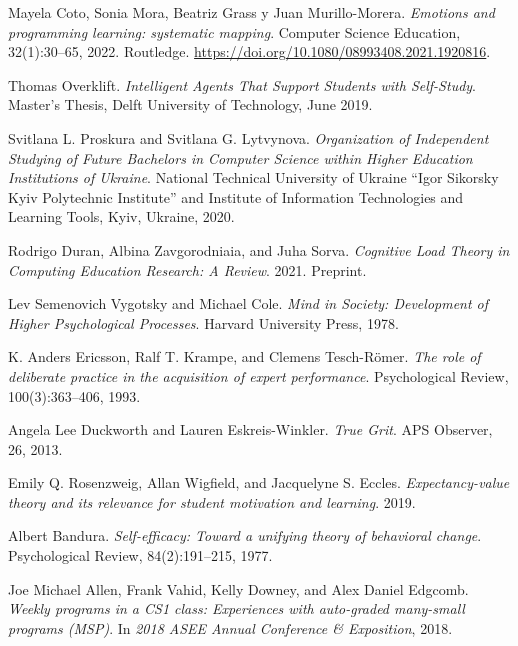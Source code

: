 \documentclass{article}
\begin{document}
\begin{thebibliography}{99}

Mayela Coto, Sonia Mora, Beatriz Grass y Juan Murillo-Morera. 
\textit{Emotions and programming learning: systematic mapping}. 
Computer Science Education, 32(1):30--65, 2022. 
Routledge. 
\url{https://doi.org/10.1080/08993408.2021.1920816}.

Thomas Overklift. 
\textit{Intelligent Agents That Support Students with Self-Study}. 
Master's Thesis, Delft University of Technology, June 2019.

Svitlana L. Proskura and Svitlana G. Lytvynova. 
\textit{Organization of Independent Studying of Future Bachelors in Computer Science within Higher Education Institutions of Ukraine}. 
National Technical University of Ukraine “Igor Sikorsky Kyiv Polytechnic Institute” and Institute of Information Technologies and Learning Tools, Kyiv, Ukraine, 2020.

Rodrigo Duran, Albina Zavgorodniaia, and Juha Sorva.
\textit{Cognitive Load Theory in Computing Education Research: A Review}.
2021. Preprint.

Lev Semenovich Vygotsky and Michael Cole.
\textit{Mind in Society: Development of Higher Psychological Processes}.
Harvard University Press, 1978.

K. Anders Ericsson, Ralf T. Krampe, and Clemens Tesch-R{\"o}mer.
\textit{The role of deliberate practice in the acquisition of expert performance}.
Psychological Review, 100(3):363--406, 1993.

Angela Lee Duckworth and Lauren Eskreis-Winkler.
\textit{True Grit}.
APS Observer, 26, 2013.

Emily Q. Rosenzweig, Allan Wigfield, and Jacquelyne S. Eccles.
\textit{Expectancy-value theory and its relevance for student motivation and learning}.
2019.

Albert Bandura.
\textit{Self-efficacy: Toward a unifying theory of behavioral change}.
Psychological Review, 84(2):191--215, 1977.

Joe Michael Allen, Frank Vahid, Kelly Downey, and Alex Daniel Edgcomb.
\textit{Weekly programs in a CS1 class: Experiences with auto-graded many-small programs (MSP)}.
In \textit{2018 ASEE Annual Conference \& Exposition}, 2018.


\end{thebibliography}
\end{document}
